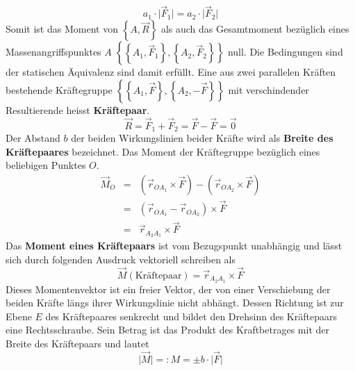  \begin{equation}
 \boxed{a_1\cdot \Big\vert\overrightarrow{F}_1\Big\vert=a_2\cdot \Big\vert\overrightarrow{F}_2\Big\vert}
 \end{equation}
 Somit ist das Moment von $\left\{A, \overrightarrow{R}\right\}$ als auch das Gesamtmoment bezüglich eines Massenangriffspunktes $A$ $\left\{\left\{A_1, \overrightarrow{F}_1\right\}, \left\{A_2, \overrightarrow{F}_2\right\}\right\}$ null. Die Bedingungen sind der statischen Äquivalenz sind damit erfüllt.
\newline\newline
Eine aus zwei parallelen Kräften bestehende Kräftegruppe $\left\{\left\{A_1, \overrightarrow{F}\right\}, \left\{A_2, -\overrightarrow{F}\right\}\right\}$ mit verschindender Resultierende heisst \textbf{Kräftepaar}.
\begin{equation}
\boxed{\overrightarrow{R}=\overrightarrow{F}_1+\overrightarrow{F}_2=\overrightarrow{F}-\overrightarrow{F}=\overrightarrow{0}}
\end{equation}
Der Abstand $b$ der beiden Wirkungslinien beider Kräfte wird als \textbf{Breite des Kräftepaares} bezeichnet. Das Moment der Kräftegruppe bezüglich eines beliebigen Punktes $O$.  
\begin{equation}
\boxed{\begin{array}{lll}
\overrightarrow{M}_O&=&\left(\overrightarrow{r}_{{OA}_1}\times \overrightarrow{F}\right)-\left(\overrightarrow{r}_{{OA}_2}\times \overrightarrow{F}\right)\\
&=&\left(\overrightarrow{r}_{OA_1}-\overrightarrow{r}_{OA_2}\right)\times \overrightarrow{F}\\
&=&\overrightarrow{r}_{A_2A_1}\times \overrightarrow{F}
\end{array}}
\end{equation}
Das \textbf{Moment eines Kräftepaars} ist vom Bezugspunkt unabhängig und lässt sich durch folgenden Ausdruck vektoriell schreiben als
\begin{equation}
\boxed{\overrightarrow{M}\left(\text{Kräftepaar}\right)=\overrightarrow{r}_{A_2A_1}\times \overrightarrow{F}}
\end{equation}
Dieses Momentenvektor ist ein freier Vektor, der von einer Verschiebung der beiden Kräfte längs ihrer Wirkungslinie nicht abhängt. Dessen Richtung ist zur Ebene $E$ des Kräftepaares senkrecht und bildet den Drehsinn des Kräftepaars eine Rechtsschraube. Sein Betrag ist das Produkt des Kraftbetrages mit der Breite des Kräftepaars und lautet
\begin{equation}
\boxed{\Big\vert \overrightarrow{M}\Big\vert=:M=\pm b\cdot \Big\vert\overrightarrow{F}\Big\vert}
\end{equation}
